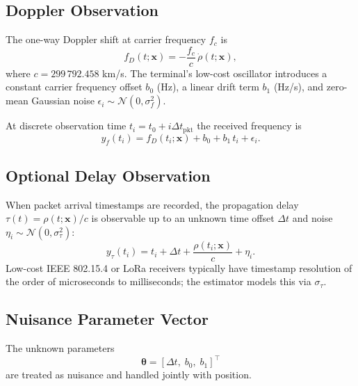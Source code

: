 \subsection{Doppler Observation}
The one-way Doppler shift at carrier frequency $f_c$ is
\begin{equation}
  f_D(t; \mathbf{x}) = -\frac{f_c}{c}\,\dot{\rho}(t; \mathbf{x}),
  \label{eq:doppler}
\end{equation}
where $c = 299\,792.458$ km/s.  The terminal's low-cost oscillator introduces
a constant carrier frequency offset $b_0$ (Hz), a linear drift term $b_1$ (Hz/s),
and zero-mean Gaussian noise $\epsilon_i \sim \mathcal{N}(0, \sigma_f^2)$.

At discrete observation time $t_i = t_0 + i\Delta t_{\text{pkt}}$ the received
frequency is
\begin{equation}
  y_f(t_i) = f_D(t_i; \mathbf{x}) + b_0 + b_1\,t_i + \epsilon_i .
  \label{eq:freq_obs}
\end{equation}

\subsection{Optional Delay Observation}
When packet arrival timestamps are recorded, the propagation delay
$\tau(t) = \rho(t; \mathbf{x})/c$ is observable up to an unknown time offset
$\Delta t$ and noise $\eta_i \sim \mathcal{N}(0, \sigma_\tau^2)$:
\begin{equation}
  y_\tau(t_i) = t_i + \Delta t + \frac{\rho(t_i; \mathbf{x})}{c} + \eta_i .
  \label{eq:delay_obs}
\end{equation}
Low-cost IEEE 802.15.4 or LoRa receivers typically have timestamp resolution
of the order of microseconds to milliseconds; the estimator models this via
$\sigma_\tau$.

\subsection{Nuisance Parameter Vector}
The unknown parameters
\begin{equation}
  \boldsymbol{\theta} = [\Delta t,\; b_0,\; b_1]^{\top}
  \label{eq:nuisance_vec}
\end{equation}
are treated as nuisance and handled jointly with position.

